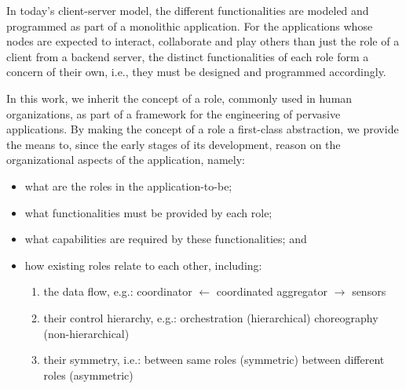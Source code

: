 
In today's client-server model, the different functionalities are modeled and programmed as part of a monolithic application. For the applications whose nodes are expected to interact, collaborate and play others than just the role of a client from a backend server, the distinct functionalities of each role form a concern of their own, i.e., they must be designed and programmed accordingly. 

In this work, we inherit the concept of a role, commonly used in human organizations, as part of a framework for the engineering of pervasive applications. By making the concept of a role a first-class abstraction, we provide the means to, since the early stages of its development, reason on the organizational aspects of the application, namely:

\begin{itemize}
	
	\item what are the roles in the application-to-be;
	
	\item what functionalities must be provided by each role;
	
	\item what capabilities are required by these functionalities; and
	
	
	\item how existing roles relate to each other, including: 
	
	\begin{enumerate}[label=-]
		
		\item the data flow, e.g.:
			\subitem coordinator $\leftarrow$ coordinated 
			\subitem aggregator  $\rightarrow$ sensors 
	
		\item their control hierarchy, e.g.:%
			\subitem orchestration (hierarchical)
			\subitem choreography (non-hierarchical)
	
		\item their symmetry, i.e.:
			\subitem between same roles (symmetric) 
			\subitem between different roles (asymmetric)
		
	\end{enumerate}	
	
\end{itemize}

